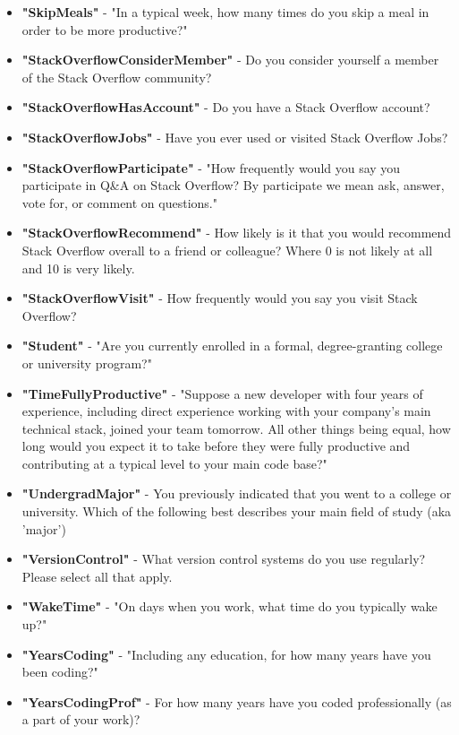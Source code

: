\begin{appendices}
\begin{itemize}
        \item \textbf{"SkipMeals"} - "In a typical week, how many times do you skip a meal in order to be more productive?"
        \item \textbf{"StackOverflowConsiderMember"} - Do you consider yourself a member of the Stack Overflow community?
        \item \textbf{"StackOverflowHasAccount"} - Do you have a Stack Overflow account?
        \item \textbf{"StackOverflowJobs"} - Have you ever used or visited Stack Overflow Jobs?
        \item \textbf{"StackOverflowParticipate"} - "How frequently would you say you participate in Q&A on Stack Overflow? By participate we mean ask, answer, vote for, or comment on questions."
        \item \textbf{"StackOverflowRecommend"} - How likely is it that you would recommend Stack Overflow overall to a friend or colleague? Where 0 is not likely at all and 10 is very likely.
        \item \textbf{"StackOverflowVisit"} - How frequently would you say you visit Stack Overflow?
        \item \textbf{"Student"} - "Are you currently enrolled in a formal, degree-granting college or university program?"
        \item \textbf{"TimeFullyProductive"} - "Suppose a new developer with four years of experience, including direct experience working with your company's main technical stack, joined your team tomorrow. All other things being equal, how long would you expect it to take before they were fully productive and contributing at a typical level to your main code base?"
        \item \textbf{"UndergradMajor"} - You previously indicated that you went to a college or university. Which of the following best describes your main field of study (aka 'major')
        \item \textbf{"VersionControl"} - What version control systems do you use regularly? Please select all that apply.
        \item \textbf{"WakeTime"} - "On days when you work, what time do you typically wake up?"
        \item \textbf{"YearsCoding"} - "Including any education, for how many years have you been coding?"
        \item \textbf{"YearsCodingProf"} - For how many years have you coded professionally (as a part of your work)?
    \end{itemize}



\end{appendices}

